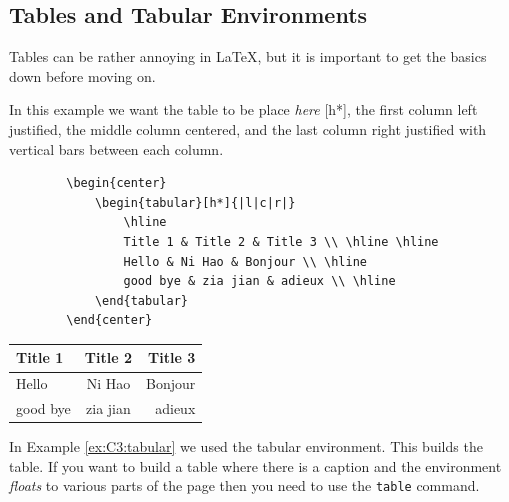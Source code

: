 \subsection{Tables and Tabular Environments}
Tables can be rather annoying in \LaTeX, but it is important to get the basics down before
moving on.   

\begin{example}\label{ex:C3:tabular} In this example we want the table to be place {\it here} [h*], the
        first column left justified, the middle column centered, and the
        last column right justified with vertical bars between each column.
        \begin{verbatim}
        \begin{center}
            \begin{tabular}[h*]{|l|c|r|}
                \hline
                Title 1 & Title 2 & Title 3 \\ \hline \hline
                Hello & Ni Hao & Bonjour \\ \hline
                good bye & zia jian & adieux \\ \hline
            \end{tabular}
        \end{center}
        \end{verbatim}
        \begin{center}
            \begin{tabular}[h*]{|l|c|r|}
                \hline
                Title 1 & Title 2 & Title 3 \\ \hline \hline
                Hello & Ni Hao & Bonjour \\ \hline
                good bye & zia jian & adieux \\ \hline
            \end{tabular}
        \end{center}
    \end{example}
In Example \ref{ex:C3:tabular} we used the tabular environment.  This builds the table.
If you want to build a table where there is a caption and the environment {\it floats} to
various parts of the page then you need to use the \texttt{table} command.  

